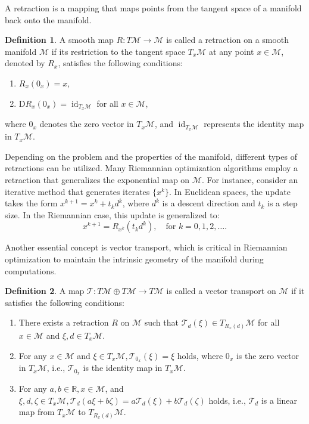 \documentclass[pdflatex,sn-mathphys-num]{sn-jnl}%
\theoremstyle{definition} %
\newtheorem{definition}{Definition}[section] %
\theoremstyle{remark} %
\begin{document}
A retraction is a mapping that maps points from the tangent space of a manifold back onto the manifold.   
\begin{definition}\cite{sato_riemannian_2021}
    A smooth map \( R \colon T\mathcal{M} \to \mathcal{M} \) is called a retraction on a smooth manifold \(\mathcal{M}\) if its restriction to the tangent space \( T_x\mathcal{M} \) at any point \( x \in \mathcal{M} \), denoted by \( R_x \), satisfies the following conditions:
    \begin{enumerate}
    \item $R_x\left(0_x\right)=x$,
    \item $\mathrm{D} R_x\left(0_x\right)=\operatorname{id}_{T_x \mathcal{M}}$ for all $x \in \mathcal{M}$, 
    \end{enumerate}
    where \(0_x\) denotes the zero vector in \(T_x \mathcal{M}\), and \(\operatorname{id}_{T_x \mathcal{M}}\) represents the identity map in \(T_x \mathcal{M}\).
\end{definition}
Depending on the problem and the properties of the manifold, different types of retractions can be utilized. Many Riemannian optimization algorithms employ a retraction that generalizes the exponential map on \(\mathcal{M}\).
For instance, consider an iterative method that generates iterates $\{x^k\}$. In Euclidean spaces, the update takes the form $x^{k+1}=x^k + t_k d ^k$, where $d^k$ is a descent direction and $t_k$ is a step size. In the Riemannian case, this update is generalized to:
$$x^{k+1}=R_{x^k}(t_k d^k),\quad \text{for }  k = 0,1,2, \ldots.$$
 

Another essential concept is vector transport, which is critical in Riemannian optimization to maintain the intrinsic geometry of the manifold during computations.
\begin{definition}\cite{sato_riemannian_2021}
A map $\mathcal{T} \colon T \mathcal{M} \oplus T \mathcal{M} \rightarrow T \mathcal{M}$ is called a vector transport on $\mathcal{M}$ if it satisfies the following conditions:
\begin{enumerate}
\item There exists a retraction $R$ on $\mathcal{M}$ such that $\mathcal{T}_d(\xi) \in T_{R_x(d)} \mathcal{M}$ for all $x \in \mathcal{M}$ and $\xi, d \in T_x \mathcal{M}$.
\item For any $x \in \mathcal{M}$ and $\xi \in T_x \mathcal{M}, \mathcal{T}_{0_x}(\xi)=\xi$ holds, where $0_x$ is the zero vector in $T_x \mathcal{M}$, i.e., $\mathcal{T}_{0_x}$ is the identity map in $T_x \mathcal{M}$.
\item For any $a, b \in \mathbb{R}, x \in \mathcal{M}$, and $\xi, d, \zeta \in T_x \mathcal{M}, \mathcal{T}_d(a \xi+b \zeta)=a \mathcal{T}_d(\xi)+b \mathcal{T}_d(\zeta)$ holds, i.e., $\mathcal{T}_d$ is a linear map from $T_x \mathcal{M}$ to $T_{R_x(d)} \mathcal{M}$.
\end{enumerate}
\end{definition}
\end{document}
